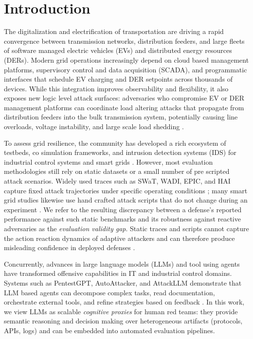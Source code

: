 \section{Introduction}
\label{sec:introduction}

The digitalization and electrification of transportation are driving a rapid convergence between transmission networks, distribution feeders, and large fleets of software managed electric vehicles (EVs) and distributed energy resources (DERs). Modern grid operations increasingly depend on cloud based management platforms, supervisory control and data acquisition (SCADA), and programmatic interfaces that schedule EV charging and DER setpoints across thousands of devices. While this integration improves observability and flexibility, it also exposes new logic level attack surfaces: adversaries who compromise EV or DER management platforms can coordinate load altering attacks that propagate from distribution feeders into the bulk transmission system, potentially causing line overloads, voltage instability, and large scale load shedding \cite{morris2013icssecurity,cintuglu2017testbeds,yohanandhan2022review,laaSurvey2024}.

To assess grid resilience, the community has developed a rich ecosystem of testbeds, co simulation frameworks, and intrusion detection systems (IDS) for industrial control systems and smart grids \cite{cintuglu2017testbeds,hardy2024helics,yohanandhan2022review}. However, most evaluation methodologies still rely on static datasets or a small number of pre scripted attack scenarios. Widely used traces such as SWaT, WADI, EPIC, and HAI capture fixed attack trajectories under specific operating conditions \cite{swatdataset,wadidataset,epicdataset,haidataset}; many smart grid studies likewise use hand crafted attack scripts that do not change during an experiment \cite{le2020gridattacksim}. We refer to the resulting discrepancy between a defense's reported performance against such static benchmarks and its robustness against reactive adversaries as the \emph{evaluation validity gap}. Static traces and scripts cannot capture the action reaction dynamics of adaptive attackers and can therefore produce misleading confidence in deployed defenses \cite{sahani2023smartgridids}.

Concurrently, advances in large language models (LLMs) and tool using agents have transformed offensive capabilities in IT and industrial control domains. Systems such as PentestGPT, AutoAttacker, and AttackLLM demonstrate that LLM based agents can decompose complex tasks, read documentation, orchestrate external tools, and refine strategies based on feedback \cite{deng2024pentestgpt,autoattacker,attackllm,fang2024llmagents}. In this work, we view LLMs as scalable \emph{cognitive proxies} for human red teams: they provide semantic reasoning and decision making over heterogeneous artifacts (protocols, APIs, logs) and can be embedded into automated evaluation pipelines.

